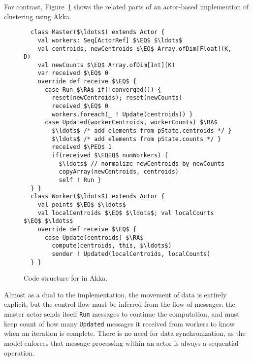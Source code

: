 For contrast, Figure~\ref{fig:kmeansakka} shows the related parts of an
actor-based implemention of \kmeans clustering using Akka.
\begin{figure}
\begin{lstlisting}
  class Master($\ldots$) extends Actor {
    val workers: Seq[ActorRef] $\EQ$ $\ldots$
    val centroids, newCentroids $\EQ$ Array.ofDim[Float](K, D)
    val newCounts $\EQ$ Array.ofDim[Int](K)
    var received $\EQ$ 0
    override def receive $\EQ$ {
      case Run $\RA$ if(!converged()) {
        reset(newCentroids); reset(newCounts)
        received $\EQ$ 0
        workers.foreach(_ ! Update(centroids)) }
      case Updated(workerCentroids, workerCounts) $\RA$
        $\ldots$ /* add elements from pState.centroids */ }
        $\ldots$ /* add elements from pState.counts */ }
        received $\PEQ$ 1
        if(received $\EQEQ$ numWorkers) {
          $\ldots$ // normalize newCentroids by newCounts
          copyArray(newCentroids, centroids)
          self ! Run }
  } }
  class Worker($\ldots$) extends Actor {
    val points $\EQ$ $\ldots$
    val localCentroids $\EQ$ $\ldots$; val localCounts $\EQ$ $\ldots$
    override def receive $\EQ$ {
      case Update(centroids) $\RA$
        compute(centroids, this, $\ldots$)
        sender ! Updated(localCentroids, localCounts)
  } }
\end{lstlisting}
\caption{Code structure for \kmeans in Akka.\label{fig:kmeansakka}}
\end{figure}
Almost as a dual to the \apgas implementation, the movement of data is entirely
explicit, but the control flow must be inferred from the flow of messages: the
master actor sends itself \lstinline{Run} messages to continue the computation,
and must keep count of how many \lstinline{Updated} messages it received from
workers to know when an iteration is complete. There is no need for data
synchronization, as the model enforces that message processing within an actor
is always a sequential operation.

